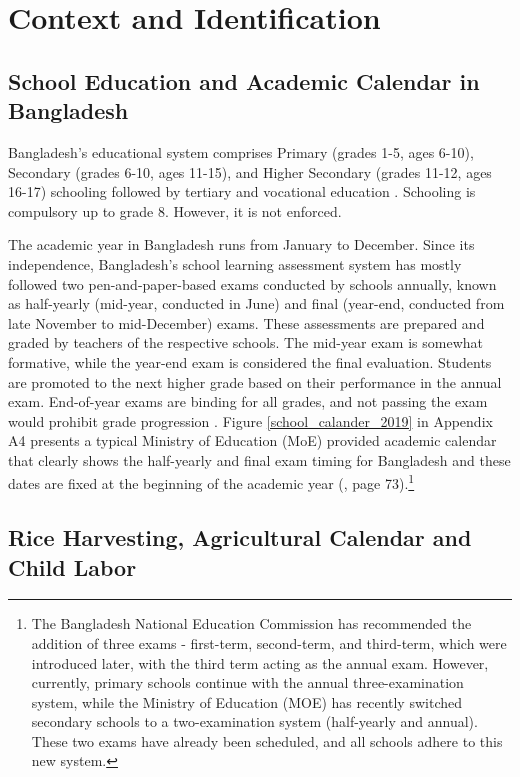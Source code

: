 \documentclass[12pt,letterpaper]{article}
\newcommand{\0}{\ensuremath{\mbox{\boldmath $0$}}}
\begin{document}
\section{Context and Identification\label{sec.id}}
\subsection{School Education and Academic Calendar in Bangladesh}

Bangladesh's educational system comprises Primary (grades 1-5, ages 6-10), Secondary (grades 6-10, ages 11-15), and Higher Secondary (grades 11-12, ages 16-17) schooling followed by tertiary and vocational education \citep{kono2018primary}. Schooling is compulsory up to grade 8. However, it is not enforced. 

The academic year in Bangladesh runs from January to December. Since its independence, Bangladesh's school learning assessment system has mostly followed two pen-and-paper-based exams conducted by schools annually, known as half-yearly (mid-year, conducted in June) and final (year-end, conducted from late November to mid-December) exams. These assessments are prepared and graded by teachers of the respective schools. The mid-year exam is somewhat formative, while the year-end exam is considered the final evaluation. Students are promoted to the next higher grade based on their performance in the annual exam. End-of-year exams are binding for all grades, and not passing the exam would prohibit grade progression \citep{de2004school,begum2008school,ADB2017}. Figure \ref{school_calander_2019} in Appendix A4 presents a typical Ministry of Education (MoE) provided academic calendar that clearly shows the half-yearly and final exam timing for Bangladesh and these dates are fixed at the beginning of the academic year (\cite{ADB2017}, page 73).\footnote{The Bangladesh National Education Commission has recommended the addition of three exams - first-term, second-term, and third-term, which were introduced later, with the third term acting as the annual exam. However, currently, primary schools continue with the annual three-examination system, while the Ministry of Education (MOE) has recently switched secondary schools to a two-examination system (half-yearly and annual). These two exams have already been scheduled, and all schools adhere to this new system. } 


\subsection{Rice Harvesting, Agricultural Calendar and Child Labor \label{sec.rice}}
\end{document}
